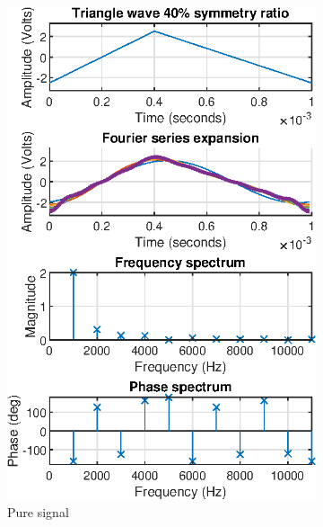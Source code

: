 \documentclass[notitlepage, a4paper, 11pt]{article}
\begin{document}
	\begin{figure}[H]
		\centering
		\begin{subfigure}{0.45\textwidth}
			\includegraphics[width=\textwidth]{../Matlab/img/tri40}
			\caption{Pure signal}
		\end{subfigure}
		\begin{subfigure}{0.45\textwidth}

\end{subfigure}
\end{figure}
\end{document}
